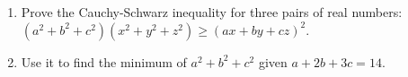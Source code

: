 \begin{enumerate}
\item[(a)] Prove the Cauchy-Schwarz inequality for three pairs of real numbers: $(a^2+b^2+c^2)(x^2+y^2+z^2)\ge(ax+by+cz)^2$.
\item[(b)] Use it to find the minimum of $a^2+b^2+c^2$ given $a+2b+3c=14$.
\end{enumerate}
